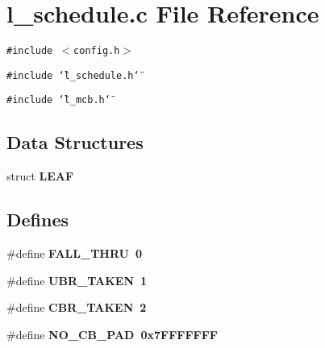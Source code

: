 \section{l\_\-schedule.c File Reference}
\label{l__schedule_8c}
{\tt \#include $<$config.h$>$}\par
{\tt \#include \char`\"{}l\_\-schedule.h\char`\"{}}\par
{\tt \#include \char`\"{}l\_\-mcb.h\char`\"{}}\par
\subsection*{Data Structures}
\begin{CompactItemize}
\item 
struct \bf{LEAF}
\end{CompactItemize}
\subsection*{Defines}
\begin{CompactItemize}
\item 
\#define \bf{FALL\_\-THRU}~0
\item 
\#define \bf{UBR\_\-TAKEN}~1
\item 
\#define \bf{CBR\_\-TAKEN}~2
\item 
\#define \bf{NO\_\-CB\_\-PAD}~0x7FFFFFFF
\end{CompactItemize}
